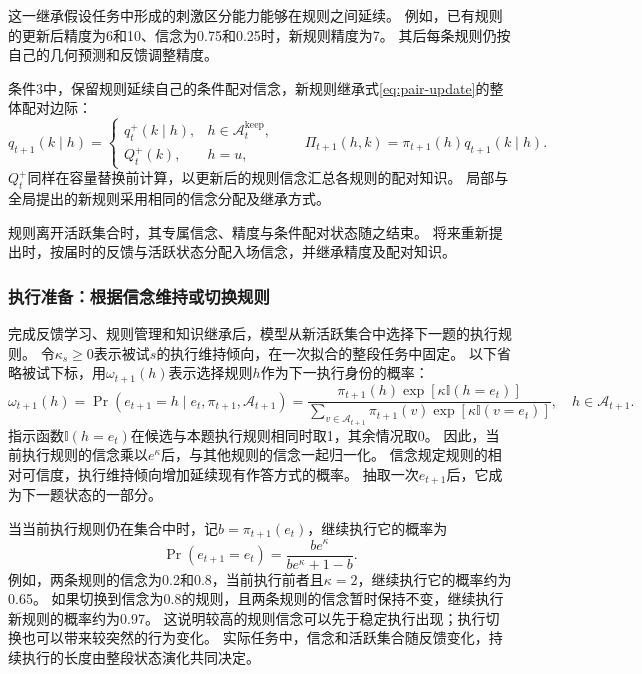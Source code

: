 \documentclass[11pt,a4paper]{article}
\numberwithin{equation}{section}
\newcommand{\ind}{\mathbb{I}}
\newcommand{\A}{\mathcal{A}}
\begin{document}
这一继承假设任务中形成的刺激区分能力能够在规则之间延续。
例如，已有规则的更新后精度为6和10、信念为0.75和0.25时，新规则精度为7。
其后每条规则仍按自己的几何预测和反馈调整精度。

条件3中，保留规则延续自己的条件配对信念，新规则继承式\eqref{eq:pair-update}的整体配对边际：
\begin{equation}
q_{t+1}(k\mid h)=\begin{cases}q_t^+(k\mid h),&h\in\A_t^{\mathrm{keep}},\\
Q_t^+(k),&h=u,\end{cases}\qquad
\Pi_{t+1}(h,k)=\pi_{t+1}(h)q_{t+1}(k\mid h).
\label{eq:pair-transfer}
\end{equation}
$Q_t^+$同样在容量替换前计算，以更新后的规则信念汇总各规则的配对知识。
局部与全局提出的新规则采用相同的信念分配及继承方式。

规则离开活跃集合时，其专属信念、精度与条件配对状态随之结束。
将来重新提出时，按届时的反馈与活跃状态分配入场信念，并继承精度及配对知识。

\subsubsection{执行准备：根据信念维持或切换规则}
\label{sec:execution}
完成反馈学习、规则管理和知识继承后，模型从新活跃集合中选择下一题的执行规则。
令$\kappa_s\geq0$表示被试$s$的执行维持倾向，在一次拟合的整段任务中固定。
以下省略被试下标，用$\omega_{t+1}(h)$表示选择规则$h$作为下一执行身份的概率：
\begin{equation}
\omega_{t+1}(h)=
\Pr(e_{t+1}=h\mid e_t,\pi_{t+1},\A_{t+1})=
\frac{\pi_{t+1}(h)\exp\!\left[\kappa\ind(h=e_t)\right]}
{\sum_{v\in\A_{t+1}}\pi_{t+1}(v)\exp\!\left[\kappa\ind(v=e_t)\right]},
\quad h\in\A_{t+1}.
\label{eq:execution}
\end{equation}
指示函数$\ind(h=e_t)$在候选与本题执行规则相同时取1，其余情况取0。
因此，当前执行规则的信念乘以$e^\kappa$后，与其他规则的信念一起归一化。
信念规定规则的相对可信度，执行维持倾向增加延续现有作答方式的概率。
抽取一次$e_{t+1}$后，它成为下一题状态的一部分。

当当前执行规则仍在集合中时，记$b=\pi_{t+1}(e_t)$，继续执行它的概率为
\begin{equation}
\Pr(e_{t+1}=e_t)=\frac{b e^\kappa}{b e^\kappa+1-b}.
\label{eq:execution-stay}
\end{equation}
例如，两条规则的信念为0.2和0.8，当前执行前者且$\kappa=2$，继续执行它的概率约为0.65。
如果切换到信念为0.8的规则，且两条规则的信念暂时保持不变，继续执行新规则的概率约为0.97。
这说明较高的规则信念可以先于稳定执行出现；执行切换也可以带来较突然的行为变化。
实际任务中，信念和活跃集合随反馈变化，持续执行的长度由整段状态演化共同决定。
\end{document}
